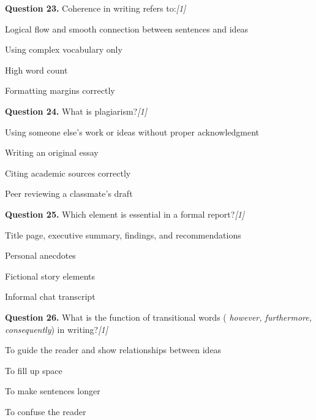 \documentclass[11pt,a4paper]{article}
\newcommand{\pts}[1]{\hfill   \textit{[#1]}}
\begin{document}
\medskip




\noindent   \textbf{Question 23.} Coherence in writing refers to:\pts{1}

\begin{parts}
  \item Logical flow and smooth connection between sentences and ideas
  \item Using complex vocabulary only
  \item High word count
  \item Formatting margins correctly
\end{parts}

\medskip




\noindent   \textbf{Question 24.} What is plagiarism?\pts{1}

\begin{parts}
  \item Using someone else's work or ideas without proper acknowledgment
  \item Writing an original essay
  \item Citing academic sources correctly
  \item Peer reviewing a classmate's draft
\end{parts}

\medskip




\noindent   \textbf{Question 25.} Which element is essential in a formal report?\pts{1}

\begin{parts}
  \item Title page, executive summary, findings, and recommendations
  \item Personal anecdotes
  \item Fictional story elements
  \item Informal chat transcript
\end{parts}

\medskip




\noindent   \textbf{Question 26.} What is the function of transitional words (   \textit{however, furthermore, consequently}) in writing?\pts{1}

\begin{parts}
  \item To guide the reader and show relationships between ideas
  \item To fill up space
  \item To make sentences longer
  \item To confuse the reader
\end{parts}
\end{document}

